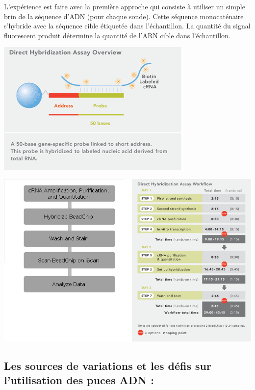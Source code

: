 \documentclass[a4paper,10pt]{article}
\begin{document}
L’expérience est faite avec la première approche qui consiste à utiliser un simple brin de la séquence d’ADN (pour chaque sonde). Cette séquence monocaténaire s’hybride avec la séquence cible étiquetée dans l’échantillon. 
La quantité du signal fluorescent produit détermine la quantité de l’ARN cible dans l’échantillon.
\begin{center}
 \includegraphics[scale=0.5]{./image/Direct_Hyb.png}
\end{center}
\begin{center}
 \includegraphics[scale=0.5]{./image/direct_hybridization_assay_workflow.png}
\end{center}

\subsection{Les sources de variations et les défis sur l'utilisation des puces ADN :}
\end{document}
